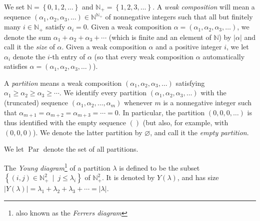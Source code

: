 \documentclass[numbers=enddot,12pt,final,onecolumn,notitlepage]{scrartcl}%
\theoremstyle{definition}
\begin{document}
We set $\mathbb{N}=\left\{  0,1,2,\ldots\right\}  $ and $\mathbb{N}%
_{+}=\left\{  1,2,3,\ldots\right\}  $. A \textit{weak composition} will mean a
sequence $\left(  \alpha_{1},\alpha_{2},\alpha_{3},\ldots\right)
\in\mathbb{N}^{\mathbb{N}_{+}}$ of nonnegative integers such that all but
finitely many $i\in\mathbb{N}_{+}$ satisfy $\alpha_{i}=0$. Given a weak
composition $\alpha=\left(  \alpha_{1},\alpha_{2},\alpha_{3},\ldots\right)  $,
we denote the sum $\alpha_{1}+\alpha_{2}+\alpha_{3}+\cdots$ (which is finite
and an element of $\mathbb{N}$) by $\left\vert \alpha\right\vert $ and call it
the \textit{size} of $\alpha$. Given a weak composition $\alpha$ and a
positive integer $i$, we let $\alpha_{i}$ denote the $i$-th entry of $\alpha$
(so that every weak composition $\alpha$ automatically satisfies
$\alpha=\left(  \alpha_{1},\alpha_{2},\alpha_{3},\ldots\right)  $).

A \textit{partition} means a weak composition $\left(  \alpha_{1},\alpha
_{2},\alpha_{3},\ldots\right)  $ satisfying $\alpha_{1}\geq\alpha_{2}%
\geq\alpha_{3}\geq\cdots$. We identify every partition $\left(  \alpha
_{1},\alpha_{2},\alpha_{3},\ldots\right)  $ with the (truncated) sequence
$\left(  \alpha_{1},\alpha_{2},\ldots,\alpha_{m}\right)  $ whenever $m$ is a
nonnegative integer such that $\alpha_{m+1}=\alpha_{m+2}=\alpha_{m+3}%
=\cdots=0$. In particular, the partition $\left(  0,0,0,\ldots\right)  $ is
thus identified with the empty sequence $\left(  {}\right)  $ (but also, for
example, with $\left(  0,0,0\right)  $). We denote the latter partition by
$\varnothing$, and call it the \textit{empty partition}.

We let $\operatorname*{Par}$ denote the set of all partitions.

The \textit{Young diagram}\footnote{also known as the \textit{Ferrers
diagram}} of a partition $\lambda$ is defined to be the subset $\left\{
\left(  i,j\right)  \in\mathbb{N}_{+}^{2}\ \mid\ j\leq\lambda_{i}\right\}  $
of $\mathbb{N}_{+}^{2}$. It is denoted by $Y\left(  \lambda\right)  $, and has
size $\left\vert Y\left(  \lambda\right)  \right\vert =\lambda_{1}+\lambda
_{2}+\lambda_{3}+\cdots=\left\vert \lambda\right\vert $.
\end{document}

